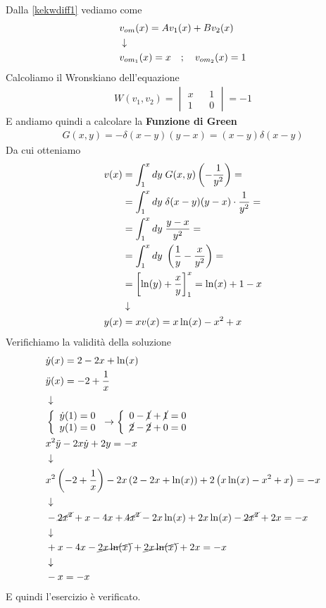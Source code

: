 Dalla \ref{kekwdiff1} vediamo come
\begin{align}
	&v_{om}(x) = A v_1(x) + B v_2(x) \nonumber \\ &\downarrow \nonumber \\
	&v_{om_1}(x) = x \quad ; \quad v_{om_2}(x) = 1
\end{align}
Calcoliamo il Wronskiano dell'equazione
\begin{align}
	W(v_1,v_2) = \begin{vmatrix}
		x && 1 \\
		1 && 0
	\end{vmatrix} = -1
\end{align}
E andiamo quindi a calcolare la \textbf{Funzione di Green}
\begin{align}
	G(x,y) = - \delta (x-y) (y-x) = (x-y) \delta(x-y)
\end{align}
Da cui otteniamo
\begin{align}
	v(x) &= \int_{1}^x dy \;G(x,y) \left(-\frac{1}{y^2}\right) = \nonumber \\
		 &= \int_{1}^x dy \; \delta (x-y) (y-x) \cdot \frac{1}{y^2}= \nonumber \\
		 &= \int_{1}^x dy \; \frac{y-x}{y^2}= \nonumber \\
		 &= \int_{1}^x dy \; \left(\frac{1}{y} - \frac{x}{y^2}\right)= \nonumber \\
		 &= \left[ \ln(y) + \frac{x}{y} \right]_1^x = \ln(x) +1 -x \nonumber \\ &\downarrow \nonumber \\
	y(x) &= xv(x) = x\ln(x) - x^2 +x
\end{align}
Verifichiamo la validità della soluzione
\begin{align}
	&\dot{y}(x) = 2 - 2x + \ln(x)\\
	&\ddot{y}(x) = -2 + \frac{1}{x} \\ &\downarrow \nonumber \\
	&\left\{ \begin{array}{cc} \dot{y}(1) = 0\\ y(1) = 0 \end{array} \right. \to \left\{ \begin{array}{cc} 0 -\cancel{1} +\cancel{1} =0\\ \cancel{2}-\cancel{2} + 0 =0 \end{array} \right.\\
	&x^2 \ddot{y} - 2x \dot{y} + 2y = -x \\ &\downarrow \nonumber \\
	&x^2 \left( -2 + \frac{1}{x} \right) -2x \left( 2 - 2x + \ln(x) \right) + 2 \left( x\ln(x) - x^2 +x \right) = -x \nonumber \\ &\downarrow \nonumber \\
	& -\cancel{2x^2} + x - 4x + \cancel{4x^2} - 2x\ln(x) + 2x\ln(x) -\cancel{2x^2} +2x = -x \nonumber \\ &\downarrow \nonumber \\
	& + x - 4x - \cancel{2x\ln(x)} + \cancel{2x\ln(x)} +2x = -x \nonumber \\ &\downarrow \nonumber \\
	& -x = -x
\end{align}
E quindi l'esercizio è verificato.

\newpage

